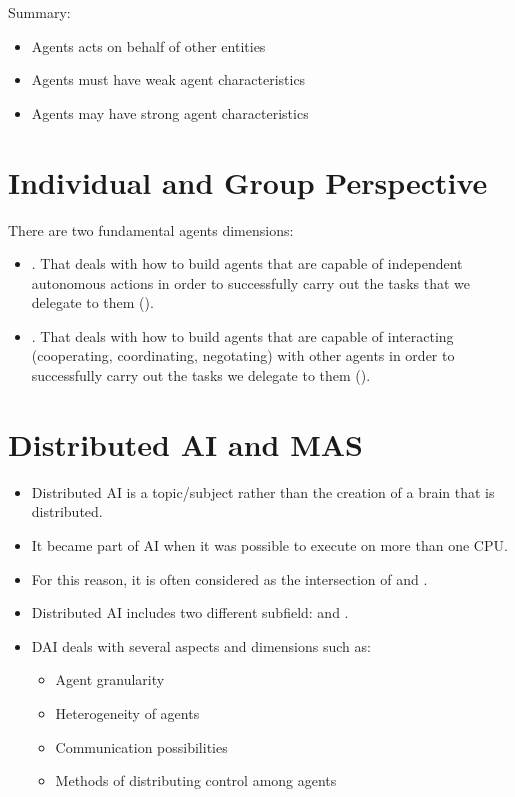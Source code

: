 \vfill
Summary:
\begin{itemize}
\item Agents acts on behalf of other entities
\item Agents must have weak agent characteristics
\item Agents may have strong agent characteristics
\end{itemize}

\section{Individual and Group Perspective}
There are two fundamental agents dimensions:
\begin{itemize}
\item {}. That deals with how to  build agents that are capable of independent autonomous actions in order to successfully carry out the tasks that we delegate to them ().
\item {}. That deals with how to build agents that are capable of interacting (cooperating, coordinating, negotating) with other agents in order to successfully carry out the tasks we delegate to them ().
\end{itemize}

\section{Distributed AI and MAS}
\begin{itemize}
\item Distributed AI is a topic/subject rather than the creation of a brain that is distributed.
\item It became part of AI when it was possible to execute on more than one CPU.
\item For this reason, it is often considered as the intersection of  and .
\missingfigure{}
\item Distributed AI includes two different subfield:  and .
\item DAI deals with several aspects and dimensions such as:
\begin{itemize}
\item Agent granularity
\item Heterogeneity of agents
\item Communication possibilities
\item Methods of distributing control among agents
\end{itemize}
\end{itemize}


